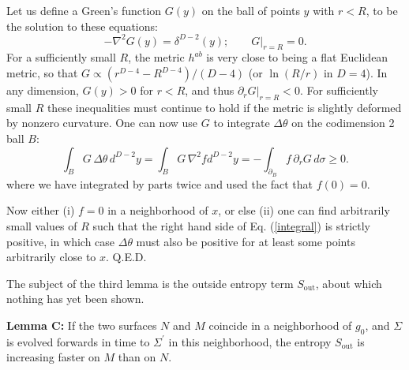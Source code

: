 \documentclass[12pt]{article}
\begin{document}
Let us define a Green's function $G(y)$ on the ball of points $y$ with $r < R$, to be the solution to these equations:
\begin{equation}
-\nabla^2 G(y) = \delta^{D-2}(y); \qquad G|_{r=R} = 0.
\end{equation}
For a sufficiently small $R$, the metric $h^{ab}$ is very close to being a flat Euclidean metric, so that $G \propto (r^{D-4} - R^{D-4})/(D-4)$ (or $\ln(R/r)$ in $D = 4$).  In any dimension, $G(y) > 0$ for $r < R$, and thus $\partial_r G|_{r=R} < 0$.  For sufficiently small $R$ these inequalities must continue to hold if the metric is slightly deformed by nonzero curvature.  One can now use $G$ to integrate $\Delta \theta$ on the codimension 2 ball $B$:
\begin{equation}\label{integral}
\int_B G\,\Delta \theta\,d^{D-2}y = \int_B G\,\nabla^2 f d^{D-2}y
= -\int_{\partial_B} f\,\partial_r G \,d\sigma\ge 0.
\end{equation}
where we have integrated by parts twice and used the fact that $f(0) = 0$.  

Now either (i) $f = 0$ in a neighborhood of $x$, or else (ii) one can find arbitrarily small values of $R$ such that the right hand side of Eq. (\ref{integral}) is strictly positive, in which case $\Delta \theta$ must also be positive for at least some points arbitrarily close to $x$.  Q.E.D.


The subject of the third lemma is the outside entropy term $S_\mathrm{out}$, about which nothing has yet been shown.

\textbf{Lemma C:} If the two surfaces $N$ and $M$ coincide in a neighborhood of $g_0$, and $\Sigma$ is evolved forwards in time to $\Sigma^\prime$ in this neighborhood, the entropy $S_\mathrm{out}$ is increasing faster on $M$ than on $N$.
\end{document}
